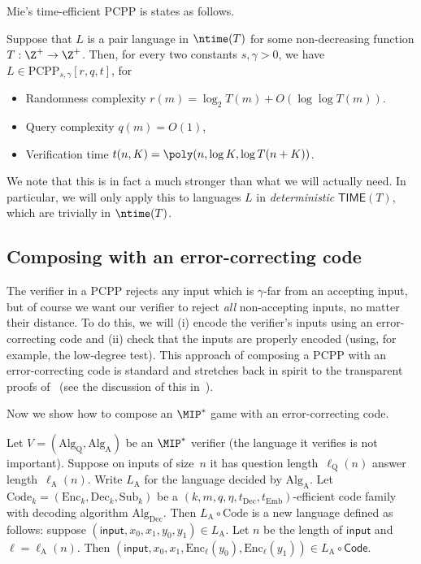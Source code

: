 \documentclass[11pt]{article}
\newcommand{\codec}{\mathrm{Code}}
\newcommand{\codee}{\mathrm{Enc}}
\newcommand{\coded}{\mathrm{Dec}}
\newcommand{\codes}{\mathrm{Sub}}
\begin{document}
Mie's time-efficient PCPP is states as follows.

\begin{theorem}\label{thm:pcpp-mie}
Suppose that $L$ is a pair language in $\ntime(T)$
for some non-decreasing function $T : \Z^+ \rightarrow \Z^+$.
Then, for every two constants $s, \gamma >0$,
we have $L \in \mathrm{PCPP}_{s, \gamma}[r, q, t]$, for
\begin{itemize}
\item[$\circ$] Randomness complexity $r(m) = \log_2 T(m) + O(\log\log T(m))$.
\item[$\circ$] Query complexity $q(m) = O(1)$,
\item[$\circ$] Verification time $t(n, K) = \poly(n, \log K, \log T(n + K))$.
\end{itemize}
\end{theorem}

We note that this is in fact a much stronger than what we will actually need.
In particular, we will only apply this to languages $L$ in \emph{deterministic} $\mathsf{TIME}(T)$,
which are trivially in $\ntime(T)$.

\subsection{Composing with an error-correcting code}\label{sec:composing-with-an-error-correcting-code}

The verifier in a PCPP rejects any input which is $\gamma$-far from an accepting input,
but of course we want our verifier to reject \emph{all} non-accepting inputs, no matter their distance.
To do this, we will (i) encode the verifier's inputs using an error-correcting code
and (ii) check that the inputs are properly encoded (using, for example, the low-degree test).
This approach of composing a PCPP with an error-correcting code is standard
and stretches back in spirit to the transparent proofs of~\cite{BFLS91} (see the discussion of this in~\cite{BGH+06}).

Now we show how to compose an $\MIP^*$ game with an error-correcting code.

\begin{definition}\label{def:error-correcting-answers}
Let $V = (\mathrm{Alg}_{\mathrm{Q}}, \mathrm{Alg}_{\mathrm{A}})$ be an $\MIP^*$ verifier (the language it verifies is not important).
Suppose on inputs of size~$n$ it has question length~$\ell_{\mathrm{Q}}(n)$ answer length~$\ell_{\mathrm{A}}(n)$.
Write $L_{\mathrm{A}}$ for the language decided by $\mathrm{Alg}_{\mathrm{A}}$.
Let $\codec_k = (\codee_k,\coded_k, \codes_k)$ be a $(k, m, q, \eta, t_{\mathrm{Dec}}, t_{\mathrm{Emb}})$-efficient code family with decoding algorithm $\mathrm{Alg}_{\mathrm{Dec}}$.
Then $L_{\mathrm{A}} \circ \codec$ is a new language defined as follows:
suppose $(\mathsf{input}, x_0, x_1, y_0, y_1) \in L_{\mathrm{A}}$.
Let $n$ be the length of $\mathsf{input}$ and $\ell = \ell_{\mathrm{A}}(n)$.
Then $(\mathsf{input}, x_0, x_1, \codee_{\ell}(y_0), \codee_{\ell}(y_1)) \in L_{\mathrm{A}} \circ \mathsf{Code}$.
\end{definition}
\end{document}
